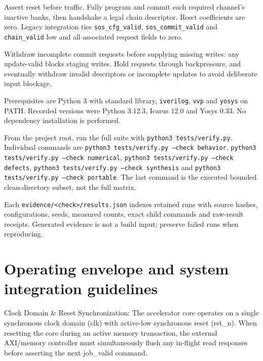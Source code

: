 \documentclass[11pt,a4paper]{article}
\begin{document}
Assert reset before traffic. Fully program and commit each required channel's inactive banks,\allowbreak{} then handshake a legal chain descriptor. Reset coefficients are zero. Legacy integration ties \texttt{sos\_\allowbreak{}cfg\_\allowbreak{}valid},\allowbreak{} \texttt{sos\_\allowbreak{}commit\_\allowbreak{}valid} and \texttt{chain\_\allowbreak{}valid} low and all associated request fields to zero.


Withdraw incomplete commit requests before supplying missing writes: any update-valid blocks staging writes. Hold requests through backpressure,\allowbreak{} and eventually withdraw invalid descriptors or incomplete updates to avoid deliberate input blockage.


Prerequisites are Python 3 with standard library,\allowbreak{} \texttt{iverilog},\allowbreak{} \texttt{vvp} and \texttt{yosys} on PATH. Recorded versions were Python 3.12.3,\allowbreak{} Icarus 12.0 and Yosys 0.33. No dependency installation is performed.


From the project root,\allowbreak{} run the full suite with \texttt{python3 tests/\allowbreak{}verify.py}. Individual commands are \texttt{python3 tests/\allowbreak{}verify.py --check behavior},\allowbreak{} \texttt{python3 tests/\allowbreak{}verify.py --check numerical},\allowbreak{} \texttt{python3 tests/\allowbreak{}verify.py --check defects},\allowbreak{} \texttt{python3 tests/\allowbreak{}verify.py --check synthesis} and \texttt{python3 tests/\allowbreak{}verify.py --check portable}. The last command is the executed bounded clean-directory subset,\allowbreak{} not the full matrix.


Each \texttt{evidence/\allowbreak{}<check>/\allowbreak{}results.json} indexes retained runs with source hashes,\allowbreak{} configurations,\allowbreak{} seeds,\allowbreak{} measured counts,\allowbreak{} exact child commands and raw-result receipts. Generated evidence is not a build input; preserve failed runs when reproducing.


\section{Operating envelope and system integration guidelines}

Clock Domain \& Reset Synchronization: The accelerator core operates on a single synchronous clock domain (\allowbreak{}clk)\allowbreak{} with active-low synchronous reset (\allowbreak{}rst\_\allowbreak{}n)\allowbreak{}. When resetting the core during an active memory transaction,\allowbreak{} the external AXI/\allowbreak{}memory controller must simultaneously flush any in-flight read responses before asserting the next job\_\allowbreak{}valid command.
\end{document}
